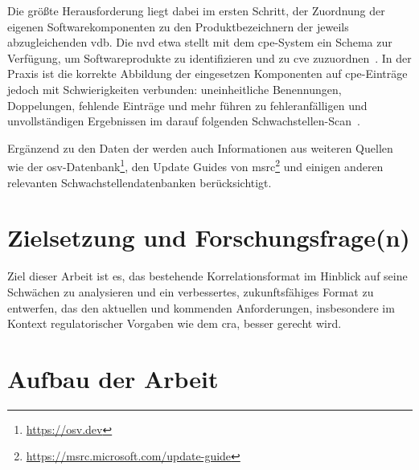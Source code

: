 Die größte Herausforderung liegt dabei im ersten Schritt, der Zuordnung der eigenen Softwarekomponenten zu den Produktbezeichnern der jeweils abzugleichenden \acrshort{vdb}.
Die \acrshort{nvd} etwa stellt mit dem \acrfull{cpe}-System ein Schema zur Verfügung, um Softwareprodukte zu identifizieren und zu \acrshort{cve} zuzuordnen\ \autocite{Cheikes_Waltermire_Scarfone_2011}.
In der Praxis ist die korrekte Abbildung der eingesetzen Komponenten auf \acrshort{cpe}-Einträge jedoch mit Schwierigkeiten verbunden:
uneinheitliche Benennungen, Doppelungen, fehlende Einträge und mehr führen zu fehleranfälligen und unvollständigen Ergebnissen im darauf folgenden Schwachstellen-Scan\ \autocite{Sanguino_Uetz_2017}.

Ergänzend zu den Daten der werden auch Informationen aus weiteren Quellen wie der \acrfull{osv}-Datenbank\footnote{\url{https://osv.dev}}, den Update Guides von \acrfull{msrc}\footnote{\url{https://msrc.microsoft.com/update-guide}} und einigen anderen relevanten Schwachstellendatenbanken berücksichtigt.

\section{Zielsetzung und Forschungsfrage(n)}\label{sec:ziel-forschungsfrage}

Ziel dieser Arbeit ist es, das bestehende Korrelationsformat im Hinblick auf seine Schwächen zu analysieren und ein verbessertes, zukunftsfähiges Format zu entwerfen, das den aktuellen und kommenden Anforderungen, insbesondere im Kontext regulatorischer Vorgaben wie dem \acrshort{cra}, besser gerecht wird.


\section{Aufbau der Arbeit}\label{sec:arbeit-aufbau}
